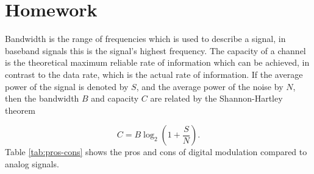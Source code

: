 \documentclass[11pt,titlepage]{report}
\begin{document}
\chapter{Homework} %
Bandwidth is the range of frequencies which is used to describe a signal, in baseband signals this is the signal's highest frequency. The capacity of a channel is the  theoretical maximum reliable rate of information which can be achieved, in contrast to the data rate, which is the actual rate of information. If the average power of the signal is denoted by $S$, and the average power of the noise by $N$, then the bandwidth $B$ and capacity $C$ are related by the Shannon-Hartley theorem

\begin{equation}
	C=B \log_2{\left(1+\frac{S}{N}\right)}.
\end{equation}
Table \ref{tab:pros-cons} shows the pros and cons of digital modulation compared to analog signals.
\end{document}
